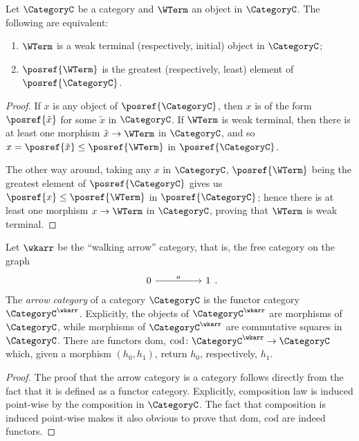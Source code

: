     \begingroup
    \def\theproposition{\ref{prop: weak terminal is greatest in posref}}
    \begin{proposition}
        Let $\CategoryC$ be a category and $\WTerm$ an object in $\CategoryC$.
        The following are equivalent:
        \begin{enumerate}[label=(\alph*)]
            \item $\WTerm$ is a weak terminal (respectively, initial) object in $\CategoryC$;
            \item $\posref{\WTerm}$ is the greatest (respectively, least) element of $\posref{\CategoryC}$.
        \end{enumerate}
    \end{proposition}
    \addtocounter{proposition}{-1}
    \endgroup
    \begin{proof}
        If $x$ is any object of $\posref{\CategoryC}$, then $x$ is of the form $\posref{\tilde{x}}$ for some $\tilde{x}$ in $\CategoryC$. 
        If $\WTerm$ is weak terminal, then there is at least one morphism $\tilde{x} \to \WTerm$ in $\CategoryC$, and so $x = \posref{\tilde{x}} \leq \posref{\WTerm}$ in $\posref{\CategoryC}$. 
        
        The other way around, taking any $x$ in $\CategoryC$, $\posref{\WTerm}$ being the greatest element of $\posref{\CategoryC}$ gives us $\posref{x} \leq \posref{\WTerm}$ in $\posref{\CategoryC}$; hence there is at least one morphism $x \to \WTerm$ in $\CategoryC$, proving that $\WTerm$ is weak terminal.
    \end{proof}

    \begingroup
    \def\thedefinition{\ref{def: arrow category}}
    \begin{definition}
        Let $\wkarr$ be the ``walking arrow'' category, that is, the free category on the graph
        \[\begin{tikzcd}
            0 && 1
            \arrow["a", from=1-1, to=1-3]
        \end{tikzcd}.\]
        The \emph{arrow category} of a category $\CategoryC$ is the functor category $\CategoryC^\wkarr$.
        Explicitly, the objects of $\CategoryC^\wkarr$ are morphisms of $\CategoryC$, while morphisms of $\CategoryC^\wkarr$ are commutative squares in $\CategoryC$.
        There are functors $\mathrm{dom}$, $\mathrm{cod}\colon \CategoryC^\wkarr \to \CategoryC$ which, given a morphism $(h_0, h_1)$, return $h_0$, respectively, $h_1$.
    \end{definition}
    \addtocounter{definition}{-1}
    \endgroup
    \begin{proof}
    The proof that the arrow category is a category follows directly from the fact that it is defined as a functor category. Explicitly, composition law is induced point-wise by the composition in $\CategoryC$. The fact that composition is induced point-wise makes it also obvious to prove that $\mathrm{dom}$, $\mathrm{cod}$ are indeed functors. 
    \end{proof}

